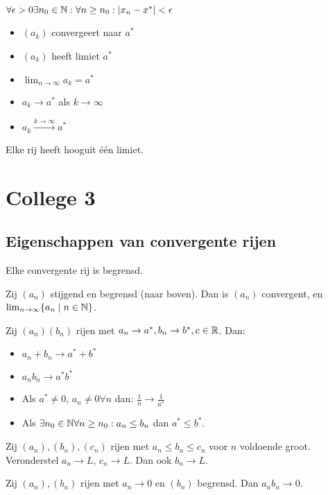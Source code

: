 \documentclass[week=1]{homework}
\begin{document}
	\Def[Limietdefinitie] $\forall \epsilon > 0 \exists n_0 \in \naturals: \forall n \ge n_0: |x_n - x^*|< \epsilon$
	
	\Not \begin{itemize}
		\item $(a_k)$ convergeert naar $a^*$ 
		\item $(a_k)$ heeft limiet $a^*$
		\item $\lim_{n \rightarrow \infty} a_k = a^*$
		\item $a_k \rightarrow a^*$ als $k \rightarrow \infty$
		\item $a_k \xrightarrow{ k \rightarrow \infty} a^*$ 
	\end{itemize}
	
	\Stel Elke rij heeft hooguit \'e\'en limiet. 
	
	\newpage
	\section*{College 3}
	\subsection*{Eigenschappen van convergente rijen}
	\Stel[2.1.11] Elke convergente rij is begrensd. 
	
	\Stel[2.4.4] Zij $(a_n)$ stijgend en begrensd (naar boven). Dan is $(a_n)$ convergent, en $\lim_{n \rightarrow \infty} \{a_n \mid n \in \mathbb{N} \}$.
	
	\Stel[Limietstellingen] Zij $(a_n) (b_n) $ rijen met $a_n \rightarrow a^*, b_n \rightarrow b^*, c \in \mathbb{R}$. Dan: 
	\begin{itemize}
		\item $a_n + b_n \rightarrow a^* + b^*$
		\item $a_n b_n \rightarrow a^* b^*$ 
		\item Als $a^* \neq 0$, $a_n \neq 0 \forall n$ dan: $\frac{1}{n} \rightarrow \frac{1}{a^*}$
		\item Als $\exists n_0 \in \mathbb{N} \forall n \ge n_0: a_n \le b_n$ dan $a^* \le b^*$. 
	\end{itemize}
	
	\Stel[Insluitstelling] Zij $(a_n), (b_n), (c_n)$ rijen met $a_n \le b_n \le c_n$ voor $n$ voldoende groot. Veronderstel $a_n \rightarrow L$, $c_n \rightarrow L$. Dan ook $b_n \rightarrow L$.
	
	\Stel Zij $(a_n), (b_n)$ rijen met $a_n \rightarrow 0$ en $(b_n)$ begrensd. Dan $a_n b_n \rightarrow 0$. 
	
\end{document}
